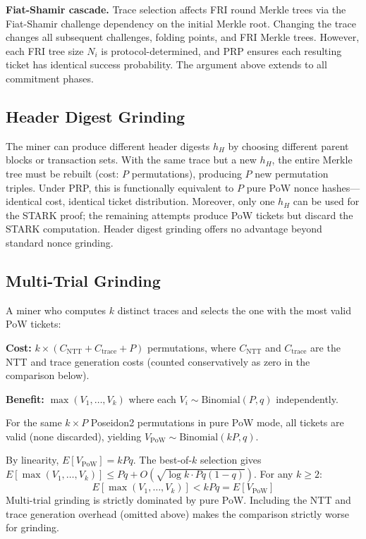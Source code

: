 \documentclass[11pt,a4paper]{article}
\begin{document}
\textbf{Fiat-Shamir cascade.} Trace selection affects FRI round Merkle trees via the Fiat-Shamir challenge dependency on the initial Merkle root. Changing the trace changes all subsequent challenges, folding points, and FRI Merkle trees. However, each FRI tree size $N_i$ is protocol-determined, and PRP ensures each resulting ticket has identical success probability. The argument above extends to all commitment phases.

\subsection{Header Digest Grinding}

The miner can produce different header digests $h_H$ by choosing different parent blocks or transaction sets. With the same trace but a new $h_H$, the entire Merkle tree must be rebuilt (cost: $P$ permutations), producing $P$ new permutation triples. Under PRP, this is functionally equivalent to $P$ pure PoW nonce hashes---identical cost, identical ticket distribution. Moreover, only one $h_H$ can be used for the STARK proof; the remaining attempts produce PoW tickets but discard the STARK computation. Header digest grinding offers no advantage beyond standard nonce grinding.

\subsection{Multi-Trial Grinding}

A miner who computes $k$ distinct traces and selects the one with the most valid PoW tickets:

\textbf{Cost:} $k \times (C_{\mathrm{NTT}} + C_{\mathrm{trace}} + P)$ permutations, where $C_{\mathrm{NTT}}$ and $C_{\mathrm{trace}}$ are the NTT and trace generation costs (counted conservatively as zero in the comparison below).

\textbf{Benefit:} $\max(V_1, \ldots, V_k)$ where each $V_i \sim \mathrm{Binomial}(P, q)$ independently.

For the same $k \times P$ Poseidon2 permutations in pure PoW mode, all tickets are valid (none discarded), yielding $V_{\mathrm{PoW}} \sim \mathrm{Binomial}(kP, q)$.

By linearity, $E[V_{\mathrm{PoW}}] = kPq$. The best-of-$k$ selection gives $E[\max(V_1, \ldots, V_k)] \leq Pq + O(\sqrt{\log k \cdot Pq(1-q)})$. For any $k \geq 2$:
\[
  E[\max(V_1, \ldots, V_k)] < kPq = E[V_{\mathrm{PoW}}]
\]
Multi-trial grinding is strictly dominated by pure PoW. Including the NTT and trace generation overhead (omitted above) makes the comparison strictly worse for grinding.
\end{document}
